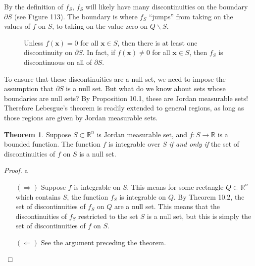 \documentclass{article}
\newcommand{\R}{\mathbb{R}}
\newcommand{\x}{\mathbf{x}}
\theoremstyle{definition}
\newtheorem{theorem}{Theorem}[section]
\begin{document}
By the definition of $f_S$, $f_S$ will likely have many discontinuities on the boundary $\partial S$ (see Figure 113). The boundary is where $f_S$ ``jumps'' from taking on the values of $f$ on $S$, to taking on the value zero on $Q\backslash S$.
	\begin{figure}[h]
	\centering
\caption{Unless $f(\x) = 0$ for all $\x\in S$, then there is at least one discontinuity on $\partial S$. In fact, if $f(\x)\neq 0$ for all $\x\in S$, then $f_S$ is discontinuous on all of $\partial S$.}
\end{figure}
To ensure that these discontinuities are a null set, we need to impose the assumption that $\partial S$ is a null set. But what do we know about sets whose boundaries are null sets? By Proposition 10.1, these are Jordan measurable sets! Therefore Lebesgue's theorem is readily extended to general regions, as long as those regions are given by Jordan measurable sets.

\begin{theorem}
	Suppose $S\subset \R^n$ is Jordan measurable set, and $f:S\to \R$ is a bounded function. The function $f$ is integrable over $S$ \textit{if and only if} the set of discontinuities of $f$ on $S$ is a null set. 
\end{theorem} 

	\begin{proof}{\color{white}a}
	\begin{enumerate}
		\item [$ (\Longrightarrow) $] Suppose $f$ is integrable on $S$. This means for some rectangle $Q\subset \R^n$ which contains $S$, the function $f_S$ is integrable on $Q$. By Theorem 10.2, the set of discontinuities of $f_S$ on $Q$ are a null set. This means that the discontinuities of $f_S$ restricted to the set $S$ is a null set, but this is simply the set of discontinuities of $f$ on $S$.
		\item [$ (\Longleftarrow) $] See the argument preceding the theorem.
	\end{enumerate}
\end{proof}
\end{document}
